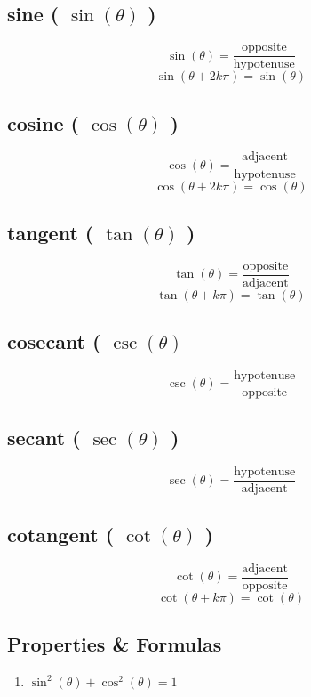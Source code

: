 \subsection{sine ( $\sin(\theta)$ )}\label{sine (sin)}

\[
    \sin(\theta) = \displaystyle \dfrac{\mathrm{opposite}}{\mathrm{hypotenuse}}
\]
\[    \sin(\theta + 2k\pi) = \sin(\theta)   \]

\subsection{cosine ( $\cos(\theta)$ )}\label{cosine (cos)}

\[
    \cos(\theta) = \displaystyle\dfrac{\mathrm {adjacent} }{\mathrm {hypotenuse} }
\]
\[  \cos(\theta + 2k\pi ) = \cos(\theta)  \]

\subsection{tangent ( $\tan(\theta)$ )}\label{tangent (tan)}

\[
    \tan(\theta) =\displaystyle \dfrac {\mathrm {opposite} }{\mathrm {adjacent} }
\]
\[  \tan(\theta + k\pi ) = \tan(\theta)  \]

\subsection{cosecant ( $\csc(\theta)$ }\label{cosecant (csc)}
\[
    \csc(\theta) =\displaystyle\dfrac {\mathrm {hypotenuse} }{\mathrm {opposite} }
\]

\subsection{secant ( $\sec(\theta)$ )}\label{secant (sec)}
\[
    \sec(\theta) =\displaystyle\dfrac {\mathrm {hypotenuse} }{\mathrm {adjacent} }
\]

\subsection{cotangent ( $\cot(\theta)$ )}\label{cotangent (cot)}

\[
    \cot(\theta) =\displaystyle\dfrac {\mathrm {adjacent} }{\mathrm {opposite} }
\]
\[  \cot(\theta + k\pi ) = \cot(\theta)  \]


\subsection{Properties \& Formulas}
\begin{enumerate}
    \item \( \sin^2(\theta) + \cos^2(\theta) = 1 \)
\end{enumerate}


